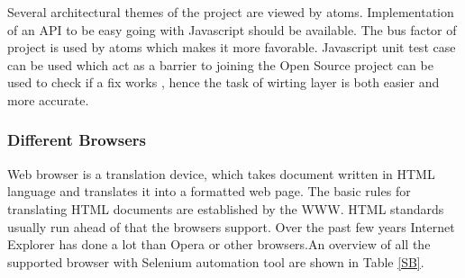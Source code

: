 \documentclass[article,type=msc,colorback,accentcolor=tud9c,twoside,11pt]{tudthesis}
\begin{document}
Several architectural themes of the project are viewed by atoms. Implementation of an API to be easy going with Javascript should be available. The bus factor of project is used by atoms which makes it more favorable. Javascript unit test case can be used which act as a barrier to joining the Open Source project can be used to check if a fix works , hence the task of wirting layer is both easier and more accurate.
\subsubsection{Different Browsers}
Web browser is a translation device, which takes document written in HTML language and translates it into a formatted web page. The basic rules for translating HTML documents are established by the WWW. HTML standards usually run ahead of that the browsers support. Over the past few years Internet Explorer has done a lot than Opera or other browsers.An overview of all the supported browser with Selenium automation tool are shown in Table \ref{SB}.
\end{document}
